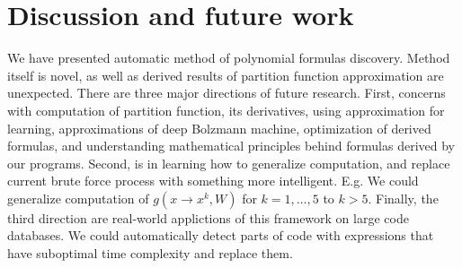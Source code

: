 \documentclass{article}
\begin{document}
\section{Discussion and future work}
We have presented automatic method of polynomial formulas discovery. Method itself is novel, as well 
as derived results of partition function approximation are unexpected.
There are three major directions of future research. First, concerns with computation of partition function,
its derivatives, using approximation for learning, 
approximations of deep Bolzmann machine, optimization of derived formulas, and 
understanding mathematical principles behind formulas derived by our programs. Second, is in 
learning how to generalize computation, and replace current brute force process with something more
intelligent. E.g. We could generalize computation of $g(x \rightarrow x^k, W)$ for $k = 1, \dots, 5$ to
$k > 5$. Finally, the third direction are real-world applictions of this framework on large code
databases. We could automatically detect parts of code with expressions that have suboptimal time complexity
and replace them. 



\nocite{*}


\end{document}
